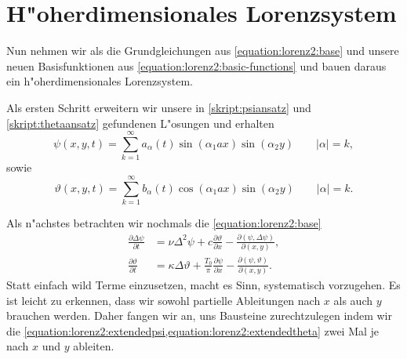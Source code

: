 \section{H"oherdimensionales Lorenzsystem\label{section:lorenz2:ho-model}}
Nun nehmen wir als die Grundgleichungen aus 
\cref{equation:lorenz2:base} und unsere neuen Basisfunktionen aus 
\cref{equation:lorenz2:basic-functions} und bauen daraus ein 
h"oherdimensionales Lorenzsystem.

Als ersten Schritt erweitern wir unsere in \cref{skript:psiansatz} und 
\cref{skript:thetaansatz} gefundenen L"osungen und erhalten
\begin{equation}
\psi(x,y,t) =
\sum_{k = 1}^{\infty}
a_{\alpha}(t)
\sin(\alpha_1 ax) \sin(\alpha_2 y)
\qquad |\alpha| = k,
\label{equation:lorenz2:extendedpsi}
\end{equation}
sowie
\begin{equation}
\vartheta(x,y,t) =
\sum_{k = 1}^{\infty}
b_{\alpha}(t)
\cos(\alpha_1 ax) \sin(\alpha_2 y)
\qquad |\alpha| = k.
\label{equation:lorenz2:extendedtheta}
\end{equation}

Als n"achstes betrachten wir nochmals die \cref{equation:lorenz2:base}
\begin{align*}
\frac{\partial\Delta\psi}{\partial t}
&=
\nu\Delta^2\psi 
+c\frac{\partial\vartheta}{\partial x}
-\frac{\partial(\psi,\Delta\psi)}{\partial(x,y)},
\\
\frac{\partial\vartheta}{\partial t}
&=
\kappa\Delta\vartheta
+ \frac{T_0}{\pi}\frac{\partial\psi}{\partial x}
- \frac{\partial(\psi,\vartheta)}{\partial(x,y)}.
\end{align*}
Statt einfach wild Terme einzusetzen, macht es Sinn, systematisch vorzugehen. 
Es ist leicht zu erkennen, dass wir sowohl partielle Ableitungen nach $x$ als 
auch $y$ brauchen werden. Daher fangen wir an, uns Bausteine zurechtzulegen 
indem wir die 
\cref{equation:lorenz2:extendedpsi,equation:lorenz2:extendedtheta} 
zwei Mal je nach $x$ und $y$ ableiten.

